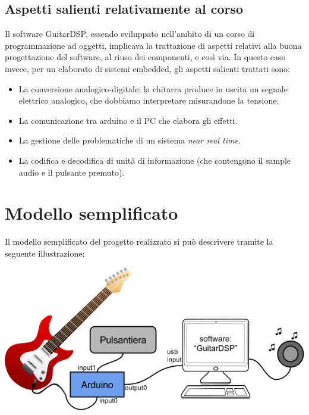 \documentclass[a4paper,11pt]{article}
\begin{document}
\subsection{Aspetti salienti relativamente al corso}

Il software GuitarDSP, essendo sviluppato nell'ambito di un corso di programmazione ad oggetti, implicava la trattazione di aspetti relativi alla buona progettazione del software, al riuso dei componenti, e così via. In questo caso invece, per un elaborato di sistemi embedded, gli aspetti salienti trattati sono:
\begin{itemize}
\item La conversione analogico-digitale: la chitarra produce in uscita un segnale elettrico analogico, che dobbiamo interpretare misurandone la tensione.
\item La comunicazione tra arduino e il PC che elabora gli effetti.
\item La gestione delle problematiche di un sistema \textit{near real time}.
\item La codifica e decodifica di unità di informazione (che contengono il sample audio e il pulsante premuto).
\end{itemize}


\section{Modello semplificato}

Il modello semplificato del progetto realizzato si può descrivere tramite la seguente illustrazione:

\begin{center}
    \includegraphics[width=0.9\linewidth]{fig1.png}
\end{center}
\end{document}
